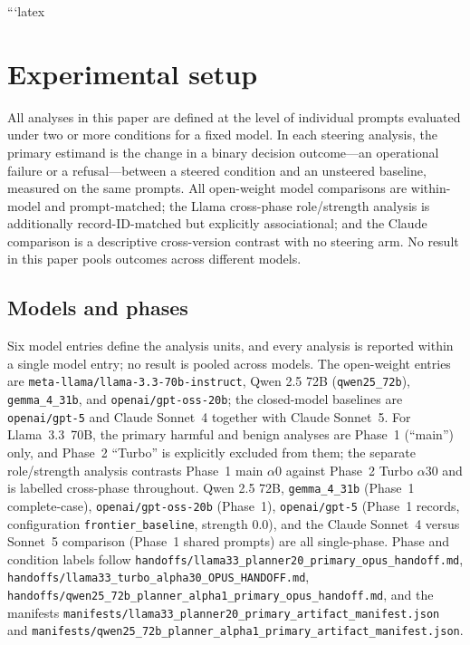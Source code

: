 ```latex
\section{Experimental setup}

All analyses in this paper are defined at the level of individual prompts
evaluated under two or more conditions for a fixed model. In each steering
analysis, the primary estimand is the change in a binary decision outcome---an
operational failure or a refusal---between a steered condition and an unsteered
baseline, measured on the same prompts. All open-weight model comparisons are
within-model and prompt-matched; the Llama cross-phase role/strength analysis is
additionally record-ID-matched but explicitly associational; and the Claude
comparison is a descriptive cross-version contrast with no steering arm. No
result in this paper pools outcomes across different models.

\subsection{Models and phases}

Six model entries define the analysis units, and every analysis is reported
within a single model entry; no result is pooled across models. The open-weight
entries are \texttt{meta-llama/llama-3.3-70b-instruct}, Qwen 2.5 72B
(\texttt{qwen25\_72b}), \texttt{gemma\_4\_31b}, and
\texttt{openai/gpt-oss-20b}; the closed-model baselines are
\texttt{openai/gpt-5} and Claude Sonnet~4 together with Claude Sonnet~5.
For Llama~3.3~70B, the primary harmful and benign analyses are Phase~1
(``main'') only, and Phase~2 ``Turbo'' is explicitly excluded from them; the
separate role/strength analysis contrasts Phase~1 main $\alpha0$ against
Phase~2 Turbo $\alpha30$ and is labelled cross-phase throughout. Qwen 2.5 72B,
\texttt{gemma\_4\_31b} (Phase~1 complete-case), \texttt{openai/gpt-oss-20b}
(Phase~1), \texttt{openai/gpt-5} (Phase~1 records, configuration
\texttt{frontier\_baseline}, strength 0.0), and the Claude Sonnet~4 versus
Sonnet~5 comparison (Phase~1 shared prompts) are all single-phase. Phase and
condition labels follow
\texttt{handoffs/llama33\_planner20\_primary\_opus\_handoff.md},
\texttt{handoffs/llama33\_turbo\_alpha30\_OPUS\_HANDOFF.md},
\texttt{handoffs/qwen25\_72b\_planner\_alpha1\_primary\_opus\_handoff.md}, and
the manifests
\texttt{manifests/llama33\_planner20\_primary\_artifact\_manifest.json} and
\texttt{manifests/qwen25\_72b\_planner\_alpha1\_primary\_artifact\_manifest.json}.


